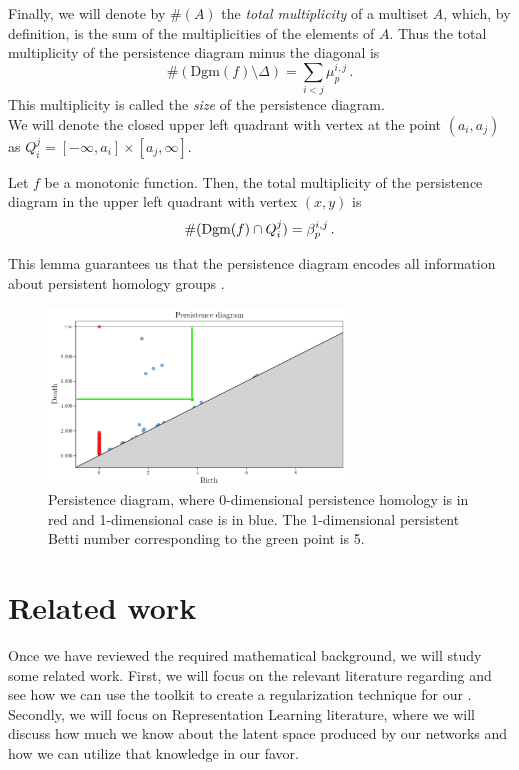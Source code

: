 \documentclass[../main.tex]{subfiles}
\begin{document}
Finally, we will denote by $\#(A)$ the \emph{total multiplicity} of a multiset $A$, which, by definition, is the sum of the multiplicities of the elements of $A$. Thus the total multiplicity of the persistence diagram minus the diagonal is
\[
\#(\text{Dgm}(f) \setminus \Delta) = \sum_{i < j} \mu_p^{i, j}\,.
\]
This multiplicity is called the \emph{size} of the persistence diagram.\\

We will denote the closed upper left quadrant with vertex at the point $(a_i, a_j)$ as $Q_{i}^{j} = [-\infty, a_i] \times [a_j, \infty]$.

\begin{lemma}
Let $f$ be a monotonic function. Then, the total multiplicity of the persistence diagram in the upper left quadrant with vertex $(x, y)$ is
\[
\#(\text{\rm Dgm}(f) \cap Q_{i}^{j})= \beta_p^{i,j}\,.
\]
\end{lemma}

This lemma guarantees us that the persistence diagram encodes all information about persistent homology groups \cite[Chapter~7]{edelsbrunner_computational_2010}.

\begin{figure}[!ht]
\centering
\includegraphics[width=0.7\textwidth]{figures/bg/persistenceEx.png} 
\caption{Persistence diagram, where 0-dimensional persistence homology is in red and 1-dimensional case is in blue. The 1-dimensional persistent Betti number corresponding to the green point is 5.}
\label{fig:persEx}
\end{figure}



\section{Related work}
Once we have reviewed the required mathematical background, we will study some related work. First, we will focus on the relevant literature regarding  and see how we can use the  toolkit to create a regularization technique for our . Secondly, we will focus on Representation Learning literature, where we will discuss how much we know about the latent space produced by our networks and how we can utilize that knowledge in our favor.
\end{document}
